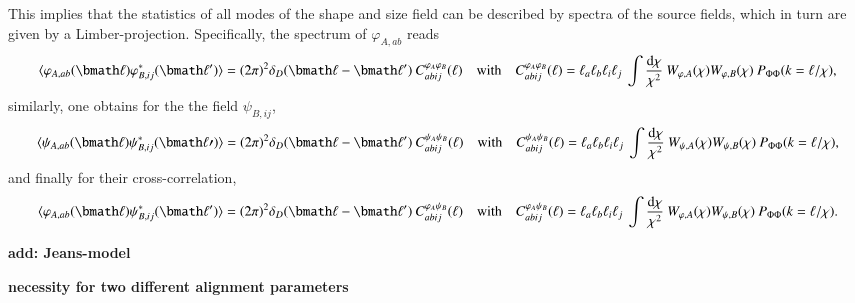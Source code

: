 \documentclass[a4paper,fleqn,usenatbib]{mnras}
\def\spirou#1{{\bf #1}}
\newcommand{\bra}{\langle}
\newcommand{\ket}{\rangle}
\newcommand{\dd}{\mathrm{d}}
\newcommand{\dirac}{\delta_D}
\begin{document}
This implies that the statistics of all modes of the shape and size field can be described by spectra of the source fields, which in turn are given by a Limber-projection. Specifically, the spectrum of $\varphi_{A,ab}$ reads
\begin{equation}
\bra\varphi_{A,ab}(\bmath\ell)\varphi_{B,ij}^*(\bmath\ell^\prime)\ket = 
(2\pi)^2\dirac(\bmath\ell-\bmath\ell^\prime)\:C^{\varphi_A\varphi_B}_{abij}(\ell)
\quad\mathrm{with}\quad
C^{\varphi_A\varphi_B}_{abij}(\ell) = 
\ell_a\ell_b\ell_i\ell_j\:\int\frac{\dd\chi}{\chi^2}\:W_{\varphi,A}(\chi)W_{\varphi,B}(\chi)\:P_{\Phi\Phi}(k = \ell/\chi),
\end{equation}
similarly, one obtains for the the field $\psi_{B,ij}$,
\begin{equation}
\bra\psi_{A,ab}(\bmath\ell)\psi_{B,ij}^*(\bmath\ell\prime)\ket = 
(2\pi)^2\dirac(\bmath\ell-\bmath\ell^\prime)\:C^{\psi_A\psi_B}_{abij}(\ell)
\quad\mathrm{with}\quad
C^{\psi_A\psi_B}_{abij}(\ell) = 
\ell_a\ell_b\ell_i\ell_j\:\int\frac{\dd\chi}{\chi^2}\:W_{\psi,A}(\chi)W_{\psi,B}(\chi)\:P_{\Phi\Phi}(k = \ell/\chi),
\end{equation}
and finally for their cross-correlation,
\begin{equation}
\bra\varphi_{A,ab}(\bmath\ell)\psi_{B,ij}^*(\bmath\ell^\prime)\ket =
(2\pi)^2\dirac(\bmath\ell-\bmath\ell^\prime)\:C^{\varphi_A\psi_B}_{abij}(\ell)
\quad\mathrm{with}\quad
C^{\varphi_A\psi_B}_{abij}(\ell) =
\ell_a\ell_b\ell_i\ell_j\:\int\frac{\dd\chi}{\chi^2}\:W_{\varphi,A}(\chi)W_{\psi,B}(\chi)\:P_{\Phi\Phi}(k = \ell/\chi).
\end{equation}


\spirou{add: Jeans-model}

\spirou{necessity for two different alignment parameters}


\end{document}
